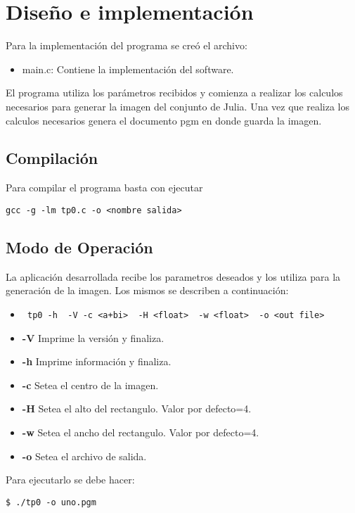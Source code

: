 		
\section{Diseño e implementación}
Para la implementación del programa se creó el archivo:
\begin{itemize}
	\item main.c: Contiene la implementación del software.
\end{itemize}

El programa utiliza los parámetros recibidos y comienza a realizar los calculos necesarios para generar la imagen del conjunto de Julia. Una vez que realiza los
calculos necesarios genera el documento pgm en donde guarda la imagen.

\subsection{Compilación}
Para compilar el programa basta con ejecutar 

\bigskip	
\texttt{gcc -g -lm tp0.c -o <nombre salida>}


\subsection{Modo de Operación}
		La aplicación desarrollada recibe los parametros deseados y los utiliza para la generación de la imagen. Los mismos se describen a continuación:
		
		\begin{itemize}
			\item \begin{verbatim} tp0 -h  -V -c <a+bi>  -H <float>  -w <float>  -o <out file> \end{verbatim}
			\item \textbf{-V} Imprime la versión y finaliza.
			\item \textbf{-h} Imprime información y finaliza.
			\item \textbf{-c} Setea el centro de la imagen.
			\item \textbf{-H} Setea el alto del rectangulo. Valor por defecto=4.
			\item \textbf{-w} Setea el ancho del rectangulo. Valor por defecto=4.
			\item \textbf{-o} Setea el archivo de salida.
		\end{itemize}


		 \bigskip
Para ejecutarlo se debe hacer:

\bigskip
\texttt{\$ ./tp0 -o uno.pgm }

